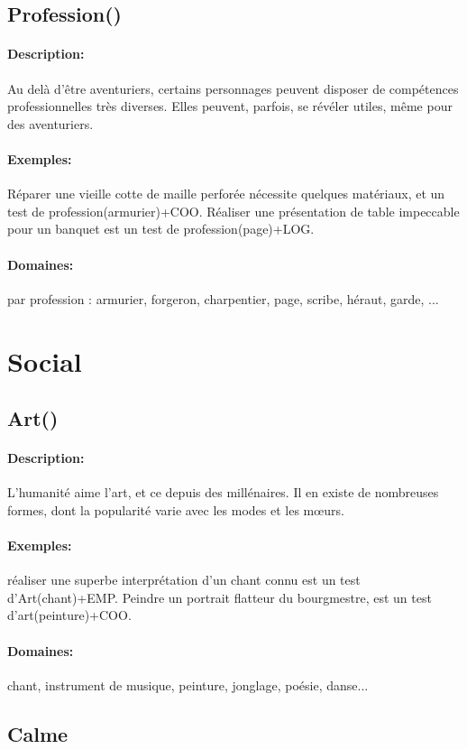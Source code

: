 \documentclass[10pt,a4paper,twocolumn]{book}
\begin{document}
\subsection{Profession()}
\paragraph{Description:}Au delà d'être aventuriers, certains personnages peuvent disposer de compétences professionnelles très diverses. Elles peuvent, parfois, se révéler utiles, même pour des aventuriers.
\paragraph{Exemples:}Réparer une vieille cotte de maille perforée nécessite quelques matériaux, et un test de profession(armurier)+COO. Réaliser une présentation de table impeccable pour un banquet est un test de profession(page)+LOG.
\paragraph{Domaines:}par profession : armurier, forgeron, charpentier, page, scribe, héraut, garde, ...

\section{Social}
\subsection{Art()}
\paragraph{Description:}L'humanité aime l'art, et ce depuis des millénaires. Il en existe de nombreuses formes, dont la popularité varie avec les modes et les mœurs. 
\paragraph{Exemples:}réaliser une superbe interprétation d'un chant connu est un test d'Art(chant)+EMP. Peindre un portrait flatteur du bourgmestre, est un test d'art(peinture)+COO.
\paragraph{Domaines:}chant, instrument de musique, peinture, jonglage, poésie, danse...
\subsection{Calme}
\end{document}
